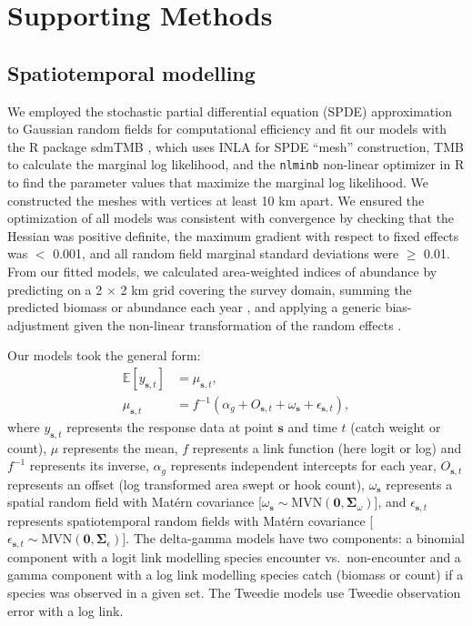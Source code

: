 \documentclass[12pt]{article}
\begin{document}
\section*{Supporting Methods}

\subsection*{Spatiotemporal modelling}

We employed the stochastic partial differential equation (SPDE) approximation to Gaussian random fields for computational efficiency and fit our models with the R package sdmTMB \citep{anderson2022}, which uses INLA \citep{lindgren2015} for SPDE ``mesh'' construction, TMB \citep{kristensen2016} to calculate the marginal log likelihood, and the \texttt{nlminb} non-linear optimizer in R \citep{r2023} to find the parameter values that maximize the marginal log likelihood.
We constructed the meshes with vertices at least 10 km apart.
We ensured the optimization of all models was consistent with convergence by checking that the Hessian was positive definite, the maximum gradient with respect to fixed effects was $<$ 0.001, and all random field marginal standard deviations were $\ge$ 0.01.
From our fitted models, we calculated area-weighted indices of abundance by predicting on a 2 $\times$ 2 km grid covering the survey domain, summing the predicted biomass or abundance each year \citep{thorson2015a}, and applying a generic bias-adjustment given the non-linear transformation of the random effects \citep{thorson2016bias}.

Our models took the general form:
\begin{align}
\mathbb{E}[y_{\boldsymbol{s},t}] &= \mu_{\boldsymbol{s},t},\\
\mu_{\boldsymbol{s},t} &=
f^{-1} \left(
\alpha_g +
O_{\boldsymbol{s},t} +
\omega_{\boldsymbol{s}} +
\epsilon_{\boldsymbol{s},t} \right),
\end{align}
\noindent
where
$y_{\boldsymbol{s},t}$ represents the response data at point $\boldsymbol{s}$ and time $t$ (catch weight or count),
$\mu$ represents the mean,
$f$ represents a link function (here logit or log) and $f^{-1}$ represents its inverse,
$\alpha_{g}$ represents independent intercepts for each year,
$O_{\boldsymbol{s},t}$ represents an offset (log transformed area swept or hook
count),
$\omega_{\boldsymbol{s}}$ represents a spatial random field with Mat\'ern covariance [$\omega_{\boldsymbol{s}} \sim \mathrm{MVN}(\boldsymbol{0},\boldsymbol{\Sigma}_\omega)$],
and $\epsilon_{\boldsymbol{s},t}$ represents spatiotemporal random fields with Mat\'ern covariance [$\epsilon_{\boldsymbol{s},t} \sim \mathrm{MVN}(\boldsymbol{0},\boldsymbol{\Sigma}_{\epsilon})$].
The delta-gamma models have two components: a binomial component with a logit link modelling species encounter vs.\ non-encounter and a gamma component with a log link modelling species catch (biomass or count) if a species was observed in a given set.
The Tweedie models use Tweedie observation error with a log link.
\end{document}

